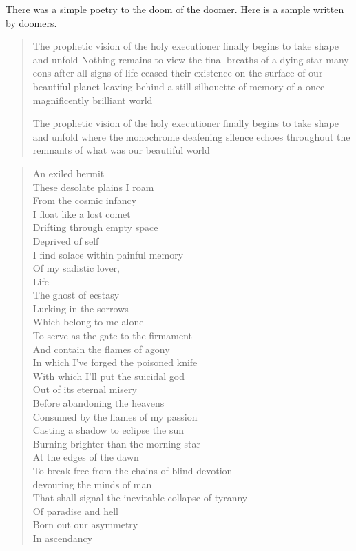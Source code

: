 \documentclass[../report.tex]{subfiles}
\begin{document}
There was a simple poetry to the doom of the doomer. Here is a sample written by doomers.

\begin{quotation}
    The prophetic vision of the holy executioner finally begins to take shape and unfold
    Nothing remains to view the final breaths of a dying star many eons after all signs
    of life ceased their existence on the surface of our beautiful planet
    leaving behind a still silhouette of memory of a once magnificently brilliant world

    The prophetic vision of the holy executioner finally begins to take shape and unfold
    where the monochrome deafening silence echoes throughout the remnants of what was our beautiful world
\end{quotation}

\begin{multicols}{2}
\begin{quotation}
    \noindent
    An exiled hermit\\
    These desolate plains I roam\\
    From the cosmic infancy\\
    I float like a lost comet\\
    Drifting through empty space\\
    Deprived of self\\
    I find solace within painful memory\\
    Of my sadistic lover,\\
    Life\\
    The ghost of ecstasy\\
    Lurking in the sorrows\\
    Which belong to me alone\\
    To serve as the gate to the firmament\\
    And contain the flames of agony\\
    In which I've forged the poisoned knife\\
    With which I'll put the suicidal god\\
    Out of its eternal misery\\
    Before abandoning the heavens\\
    Consumed by the flames of my passion\\
    Casting a shadow to eclipse the sun\\
    Burning brighter than the morning star\\
    At the edges of the dawn\\
    To break free from the chains of blind devotion\\
    devouring the minds of man\\
    That shall signal the inevitable collapse of tyranny\\
    Of paradise and hell\\
    Born out our asymmetry\\
    In ascendancy\\
\end{quotation}
\end{multicols}
\end{document}
